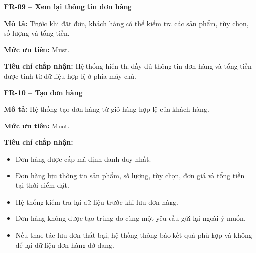 \documentclass[a4paper]{article}
\begin{document}
\noindent\textbf{FR-09 – Xem lại thông tin đơn hàng}\par\nopagebreak
\begin{list}{}{%
    \setlength{\leftmargin}{0.8cm}%
    \setlength{\rightmargin}{0pt}%
    \setlength{\labelwidth}{0pt}%
    \setlength{\labelsep}{0pt}%
    \setlength{\itemindent}{0pt}%
    \setlength{\listparindent}{0pt}%
    \setlength{\itemsep}{5pt}%
    \setlength{\parsep}{0pt}%
    \setlength{\topsep}{5pt}%
}
\item[] \textbf{Mô tả:} Trước khi đặt đơn, khách hàng có thể kiểm tra các sản phẩm, tùy chọn, số lượng và tổng tiền.
\item[] \textbf{Mức ưu tiên:} Must.
\item[] \textbf{Tiêu chí chấp nhận:} Hệ thống hiển thị đầy đủ thông tin đơn hàng và tổng tiền được tính từ dữ liệu hợp lệ ở phía máy chủ.
\end{list}

\par\ifdim\dimexpr\pagegoal-\pagetotal\relax<6\baselineskip\newpage\fi
{}

\noindent\textbf{FR-10 – Tạo đơn hàng}\par\nopagebreak
\begin{list}{}{%
    \setlength{\leftmargin}{0.8cm}%
    \setlength{\rightmargin}{0pt}%
    \setlength{\labelwidth}{0pt}%
    \setlength{\labelsep}{0pt}%
    \setlength{\itemindent}{0pt}%
    \setlength{\listparindent}{0pt}%
    \setlength{\itemsep}{5pt}%
    \setlength{\parsep}{0pt}%
    \setlength{\topsep}{5pt}%
}
\item[] \textbf{Mô tả:} Hệ thống tạo đơn hàng từ giỏ hàng hợp lệ của khách hàng.
\item[] \textbf{Mức ưu tiên:} Must.
\item[] \textbf{Tiêu chí chấp nhận:} 
\begin{itemize}
\item Đơn hàng được cấp mã định danh duy nhất.
\item Đơn hàng lưu thông tin sản phẩm, số lượng, tùy chọn, đơn giá và tổng tiền tại thời điểm đặt.
\item Hệ thống kiểm tra lại dữ liệu trước khi lưu đơn hàng.
\item Đơn hàng không được tạo trùng do cùng một yêu cầu gửi lại ngoài ý muốn.
\item Nếu thao tác lưu đơn thất bại, hệ thống thông báo kết quả phù hợp và không để lại dữ liệu đơn hàng dở dang.
\end{itemize}
\end{list}
\end{document}
